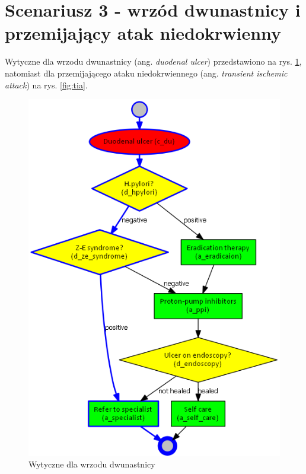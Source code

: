 \newpage
\section{Scenariusz 3 - wrzód dwunastnicy i przemijający atak niedokrwienny}
Wytyczne dla wrzodu dwunastnicy (ang. \textit{duodenal ulcer}) przedstawiono na rys. \ref{fig:du}, natomiast dla przemijającego ataku niedokrwiennego (ang. \textit{transient ischemic attack}) na rys. \ref{fig:tia}.
\begin{figure}[H]
\centering
\includegraphics[scale=0.45]{img/du.png}
\caption{Wytyczne dla wrzodu dwunastnicy}
\label{fig:du}
\end{figure}


